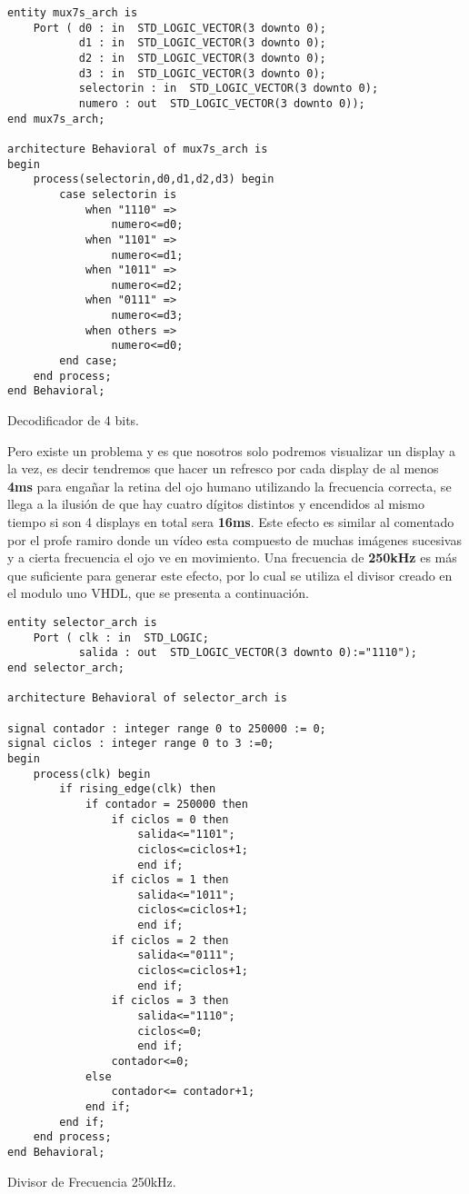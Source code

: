 \documentclass[paper=a4, fontsize=12pt]{article}        %
\numberwithin{equation}{section}                        %
\numberwithin{table}{section}                           %
\begin{document}
\begin{listing}[H]
    \begin{verbatim}
entity mux7s_arch is
    Port ( d0 : in  STD_LOGIC_VECTOR(3 downto 0);
           d1 : in  STD_LOGIC_VECTOR(3 downto 0);
           d2 : in  STD_LOGIC_VECTOR(3 downto 0);
           d3 : in  STD_LOGIC_VECTOR(3 downto 0);
           selectorin : in  STD_LOGIC_VECTOR(3 downto 0);
           numero : out  STD_LOGIC_VECTOR(3 downto 0));
end mux7s_arch;

architecture Behavioral of mux7s_arch is
begin
    process(selectorin,d0,d1,d2,d3) begin
        case selectorin is
            when "1110" =>
                numero<=d0;
            when "1101" =>
                numero<=d1;
            when "1011" =>
                numero<=d2;
            when "0111" =>
                numero<=d3;
            when others =>
                numero<=d0;
        end case;
    end process;
end Behavioral;
\end{verbatim}
\caption{Decodificador de 4 bits.}
    \label{mux2}
\end{listing}

Pero existe un problema y es que nosotros solo podremos visualizar un display a la vez, es decir tendremos que hacer un refresco por cada display de al menos \textbf{4ms} para engañar la retina del ojo humano utilizando la frecuencia correcta, se llega a la ilusión de que hay cuatro dígitos distintos y encendidos al mismo tiempo si son 4 displays en total sera \textbf{16ms}. Este efecto es similar al comentado por el profe ramiro donde un vídeo esta compuesto de muchas imágenes sucesivas y a cierta frecuencia el ojo ve en movimiento. Una frecuencia de \textbf{250kHz} es más que suficiente para generar este efecto, por lo cual se utiliza el divisor creado en el modulo uno VHDL, que se presenta a continuación. 

\begin{listing}[H]
    \begin{verbatim}
entity selector_arch is
    Port ( clk : in  STD_LOGIC;
           salida : out  STD_LOGIC_VECTOR(3 downto 0):="1110");
end selector_arch;

architecture Behavioral of selector_arch is

signal contador : integer range 0 to 250000 := 0;
signal ciclos : integer range 0 to 3 :=0;
begin
    process(clk) begin
        if rising_edge(clk) then
            if contador = 250000 then
                if ciclos = 0 then
                    salida<="1101";
                    ciclos<=ciclos+1;
                    end if;
                if ciclos = 1 then
                    salida<="1011";
                    ciclos<=ciclos+1;
                    end if;
                if ciclos = 2 then
                    salida<="0111";
                    ciclos<=ciclos+1;
                    end if;
                if ciclos = 3 then
                    salida<="1110";
                    ciclos<=0;
                    end if;
                contador<=0;
            else
                contador<= contador+1;
            end if;
        end if;
    end process;
end Behavioral;
\end{verbatim}
\caption{Divisor de Frecuencia 250kHz.}
    \label{mux2}
\end{listing}
\end{document}

